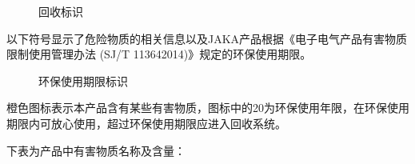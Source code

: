 \documentclass[a4paper,11pt,english,openany,oneside]{sphinxmanual}
\begin{document}
\begin{figure}[H]
\centering
\capstart

\noindent{}
\caption{回收标识}\label{\detokenize{10 _u56de_u6536_u5904_u7406:id2}}\end{figure}



\sphinxAtStartPar
{}

\sphinxAtStartPar
以下符号显示了危险物质的相关信息以及JAKA产品根据《电子电气产品有害物质 限制使用管理办法 (SJ/T 11364\sphinxhyphen{}2014)》规定的环保使用期限。

\begin{figure}[H]
\centering
\capstart

\noindent{}
\caption{环保使用期限标识}\label{\detokenize{10 _u56de_u6536_u5904_u7406:id3}}\end{figure}



\sphinxAtStartPar
橙色图标表示本产品含有某些有害物质，图标中的20为环保使用年限，在环保使用期限内可放心使用，超过环保使用期限应进入回收系统。

\sphinxAtStartPar
下表为产品中有害物质名称及含量：
\end{document}
